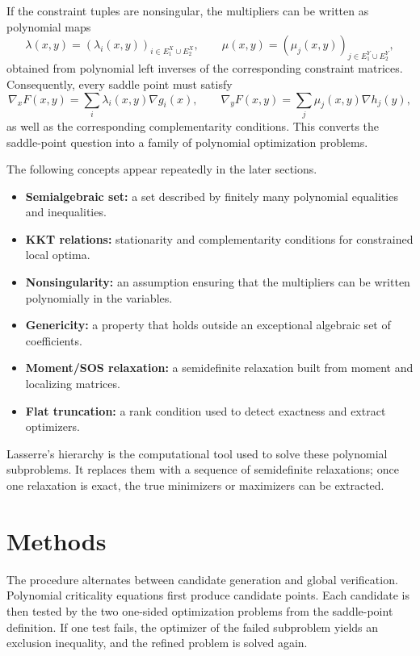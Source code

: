 \documentclass[11pt]{article}
\begin{document}
If the constraint tuples are nonsingular, the multipliers can be written as polynomial maps
\[
\lambda(x,y)=(\lambda_i(x,y))_{i\in E_1^X\cup E_2^X},
\qquad
\mu(x,y)=(\mu_j(x,y))_{j\in E_1^Y\cup E_2^Y},
\]
obtained from polynomial left inverses of the corresponding constraint matrices. Consequently, every saddle point must satisfy
\[
\nabla_x F(x,y)=\sum_i \lambda_i(x,y)\nabla g_i(x),
\qquad
\nabla_y F(x,y)=\sum_j \mu_j(x,y)\nabla h_j(y),
\]
as well as the corresponding complementarity conditions. This converts the saddle-point question into a family of polynomial optimization problems. 

The following concepts appear repeatedly in the later sections.
\begin{itemize}
\item \textbf{Semialgebraic set:} a set described by finitely many polynomial equalities and inequalities.
\item \textbf{KKT relations:} stationarity and complementarity conditions for constrained local optima.
\item \textbf{Nonsingularity:} an assumption ensuring that the multipliers can be written polynomially in the variables.
\item \textbf{Genericity:} a property that holds outside an exceptional algebraic set of coefficients.
\item \textbf{Moment/SOS relaxation:} a semidefinite relaxation built from moment and localizing matrices.
\item \textbf{Flat truncation:} a rank condition used to detect exactness and extract optimizers.
\end{itemize}

Lasserre's hierarchy is the computational tool used to solve these polynomial subproblems. It replaces them with a sequence of semidefinite relaxations; once one relaxation is exact, the true minimizers or maximizers can be extracted.

\section{Methods}
The procedure alternates between candidate generation and global verification. Polynomial criticality equations first produce candidate points. Each candidate is then tested by the two one-sided optimization problems from the saddle-point definition. If one test fails, the optimizer of the failed subproblem yields an exclusion inequality, and the refined problem is solved again.
\end{document}
